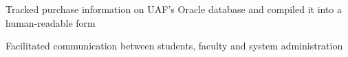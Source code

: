 \begin{job}

  \item Tracked purchase information on UAF's Oracle database and compiled it into a human-readable form
  \item Facilitated communication between students, faculty and system administration
\end{job}

